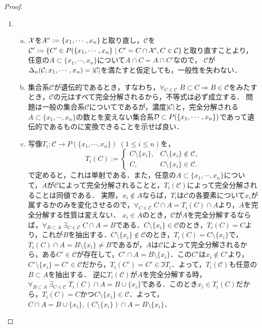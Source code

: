 \documentclass[uplatex,dvipdfmx]{jsreport}
\renewcommand{\C}{\mathcal{C}}
\begin{document}
\begin{proof}\mbox{}
    \begin{enumerate}
        \item \begin{enumerate}[(a)]
            \item $\mathcal{X}$を$\mathcal{X}':=\{x_1,\cdots,x_n\}$と取り直し，$\C$を$\C':=\Brace{C'\in P(\{x_1,\cdots,x_n\}\mid C'=C\cap\X',C\in\C}$と取り直すことより，任意の$A\subset\{x_1,\cdots,x_n\}$について$A\cap C=A\cap C'$なので，
            $\C$が$\Delta_n(\C;x_1,\cdots,x_n)=\abs{\C}$を満たすと仮定しても，一般性を失わない．
            \item 集合系$\C$が遺伝的であるとき，すなわち，$\forall_{C\in\C}\;B\subset C\Rightarrow B\in\C$をみたすとき，$\C$の元はすべて完全分解されるから，不等式は必ず成立する．
            問題は一般の集合系$\C$についてであるが，濃度$\abs{\C}$と，完全分解される$A\subset\{x_1,\cdots,x_n\}$の数とを変えない集合系$\mathcal{D}\subset P(\{x_1,\cdots,x_n\})$であって遺伝的であるものに変換できることを示せば良い．
            \item 写像$T_i:\C\to P(\{x_1,\cdots,x_n\})\;(1\le i\le n)$を，
            \[T_i(C):=\begin{cases}
                C\setminus\{x_i\},&C\setminus\{x_i\}\notin\C,\\
                C,&C\setminus\{x_i\}\in\C.
            \end{cases}\]
            で定めると，これは単射である．また，任意の$A\subset\{x_1,\cdots,x_n\}$について，$A$が$\C$によって完全分解されることと，$T_i(\C)$によって完全分解されることは同値である．
            実際，$x_i\notin A$ならば，$T_i$は$\C$の各要素について$x_i$が属するかのみを変化させるので，$\forall_{C\in\C}\;C\cap A=T_i(C)\cap A$より，$A$を完全分解する性質は変えない．
            $x_i\in A$のとき，$\C$が$A$を完全分解するならば，$\forall_{B\subset A}\;\exists_{C\in\C}\;C\cap A=B$である．$C\setminus\{x_i\}\in\C$のとき，$T_i(C)=C$より，これが$B$を抽出する．$C\setminus\{x_i\}\notin\C$のとき，$T_i(C)=C\setminus\{x_i\}$で，
            $T_i(C)\cap A=B\setminus\{x_i\}\ne B$であるが，$A$は$\C$によって完全分解されるから，ある$C'\in\C$が存在して，$C'\cap A=B\setminus\{x_i\}$．この$C'$は$x_i\notin C'$より，$C'\setminus\{x_i\}=C'\in\C$だから，$T_i(C')=C'\in\Im T_i$．よって，$T_i(\C)$も任意の$B\subset A$を抽出する．
            逆に$T_i(\C)$が$A$を完全分解する時，$\forall_{B\subset A}\;\exists_{C\in\C}\;T_i(C)\cap A=B\cup\{x_i\}$である．このとき$x_i\in T_i(C)$だから，$T_i(C)=C$かつ$C\setminus\{x_i\}\in\C$．よって，$C\cap A=B\cup\{x_i\},(C\setminus\{x_i\})\cap A=B\setminus\{x_i\}$．

\end{enumerate}
\end{enumerate}
\end{proof}
\end{document}
